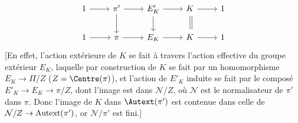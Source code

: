 \[\begin{tikzcd}
	1 & {\pi'} & {E'_K} & K & 1 \\
	1 & \pi & {E_K} & K & 1
	\arrow[from=1-1, to=1-2]
	\arrow[from=1-2, to=1-3]
	\arrow[from=1-3, to=1-4]
	\arrow[from=1-4, to=1-5]
	\arrow[from=2-1, to=2-2]
	\arrow[from=2-2, to=2-3]
	\arrow[from=2-3, to=2-4]
	\arrow[from=2-4, to=2-5]
	\arrow[from=1-2, to=2-2]
	\arrow[from=1-3, to=2-3]
	\arrow[shift left=1, shorten <=2pt, shorten >=2pt, no head, from=1-4, to=2-4]
	\arrow[shorten <=2pt, shorten >=2pt, no head, from=1-4, to=2-4]
\end{tikzcd}\]
[En effet, l'action extérieure de $K$ se fait à travers l'action effective du groupe extérieur $E_K$, laquelle par construction de $K$ se fait par un homomorphisme $E_K\to\Pi/Z$ ($Z={\Centre} (\pi)$), et l'action de $E'_K$ induite se fait par le composé $E'_K\to E_K\to\pi/Z$, dont l'image est dans $\mathcal{N}/Z$, où $\mathcal{N}$ est le normalisateur de $\pi'$ dans $\pi$. Donc l'image de $K$ dans ${\Autext}(\pi')$ est contenue dans celle de $\mathcal{N}/Z\to{\rm Autext}(\pi')$, or $\mathcal{N}/\pi'$ est fini.]

